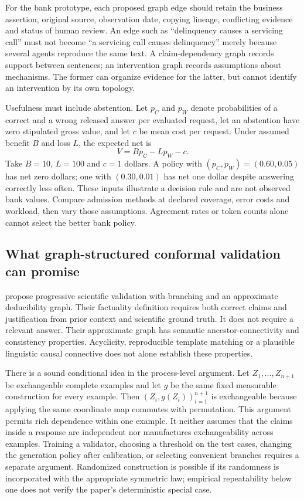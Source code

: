 For the bank prototype, each proposed graph edge should retain the business
assertion, original source, observation date, copying lineage, conflicting
evidence and status of human review. An edge such as ``delinquency causes a
servicing call'' must not become ``a servicing call causes delinquency'' merely
because several agents reproduce the same text. A claim-dependency graph
records support between sentences; an intervention graph records assumptions
about mechanisms. The former can organize evidence for the latter, but cannot
identify an intervention by its own topology.

Usefulness must include abstention. Let $p_C$ and $p_W$ denote probabilities
of a correct and a wrong released answer per evaluated request, let an
abstention have zero stipulated gross value, and let $c$ be mean cost per
request. Under assumed benefit $B$ and loss $L$, the expected net is
\begin{equation}
 V=Bp_C-Lp_W-c.
 \label{exec23:admit-value}
\end{equation}
Take $B=10$, $L=100$ and $c=1$ dollars. A policy with
$(p_C,p_W)=(0.60,0.05)$ has net zero dollars; one with
$(0.30,0.01)$ has net one dollar despite answering correctly less often.
These inputs illustrate a decision rule and are not observed bank values.
Compare admission methods at declared coverage, error costs and workload,
then vary those assumptions. Agreement rates or token counts alone cannot
select the better bank policy\citep{exec23_admission_conformal_reference}.

\subsection{What graph-structured conformal validation can promise}
\label{exec23:admit-conformal}
\citet{exec23_scientific_conformal} propose progressive scientific validation
with branching and an approximate deducibility graph. Their factuality
definition requires both correct claims and justification from prior context
and scientific ground truth. It does not require a relevant answer. Their
approximate graph has semantic ancestor-connectivity and consistency
properties. Acyclicity, reproducible template matching or a plausible
linguistic causal connective does not alone establish these properties.

There is a sound conditional idea in the process-level argument. Let
$Z_1,\ldots,Z_{n+1}$ be exchangeable complete examples and let $g$ be the same
fixed measurable construction for every example. Then
$(Z_i,g(Z_i))_{i=1}^{n+1}$ is exchangeable because applying the same coordinate
map commutes with permutation. This argument permits rich dependence within
one example. It neither assumes that the claims inside a response are
independent nor manufactures exchangeability across examples. Training a
validator, choosing a threshold on the test cases, changing the generation
policy after calibration, or selecting convenient branches requires a
separate argument. Randomized construction is possible if its randomness is
incorporated with the appropriate symmetric law; empirical repeatability
below one does not verify the paper's deterministic special case.

